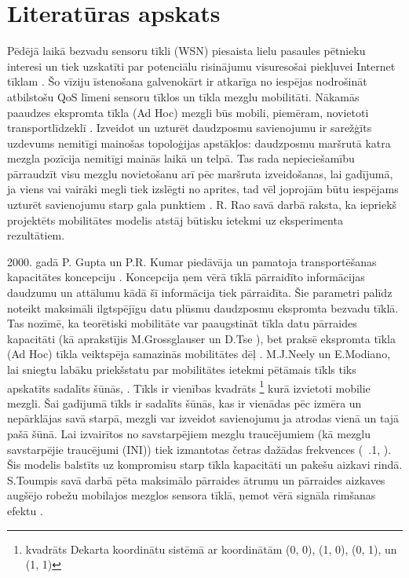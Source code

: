 \section{Literatūras apskats}\label{sec:lit}
Pēdējā laikā bezvadu sensoru tīkli (\acs{WSN}) piesaista lielu pasaules pētnieku interesi un tiek uzskatīti par potenciālu risinājumu visuresošai piekļuvei Internet tīklam \cite{perkinsBook,toh}. Šo vīziju īstenošana galvenokārt ir atkarīga no iespējas nodrošināt atbilstošu \acs{QoS} līmeni sensoru tīklos un tīkla mezglu mobilitāti. Nākamās paaudzes ekspromta tīkla (\acs{Ad Hoc}) mezgli būs mobili, piemēram, novietoti transportlīdzeklī \cite{dsdv_mobPc}. Izveidot un uzturēt daudzposmu savienojumu ir sarežģīts uzdevums nemitīgi mainošas topoloģijas apstākļos: daudzposmu maršrutā katra mezgla pozīcija nemitīgi mainās laikā un telpā. Tas rada nepieciešamību pārraudzīt visu mezglu novietošanu arī pēc maršruta izveidošanas, lai gadījumā, ja viens vai vairāki megli tiek izslēgti no aprites, tad vēl joprojām būtu iespējams uzturēt savienojumu starp gala punktiem \cite{park, lim, son}. R. Rao savā darbā \cite{rao} raksta, ka iepriekš projektēts mobilitātes modelis atstāj būtisku ietekmi uz eksperimenta rezultātiem.

2000. gadā P. Gupta un P.R. Kumar piedāvāja un pamatoja transportēšanas kapacitātes koncepciju \cite{gupta}. Koncepcija ņem vērā tīklā pārraidīto informācijas daudzumu un attālumu kādā šī informācija tiek pārraidīta. Šie parametri palīdz noteikt maksimāli ilgtspējīgu datu plūsmu daudzposmu ekspromta bezvadu tīklā. Tas nozīmē, ka teorētiski mobilitāte var paaugstināt tīkla datu pārraides kapacitāti (kā aprakstījis M.Grossglauser un D.Tse \cite{grossglauser}), bet praksē ekspromta tīkla (\acs{Ad Hoc}) tīkla veiktspēja samazinās mobilitātes dēļ \cite{perkins_hughes}. M.J.Neely un E.Modiano, lai sniegtu labāku priekšstatu par mobilitātes ietekmi pētāmais tīkls tiks apskatīts sadalīts šūnās, \seename \cite{neely1}. Tīkls ir vienības kvadrāts \footnote{kvadrāts Dekarta koordinātu sistēmā ar koordinātām (0, 0), (1, 0), (0, 1), un (1, 1)} kurā izvietoti mobilie mezgli. Šai gadījumā tīkls ir sadalīts šūnās, kas ir vienādas pēc izmēra un nepārklājas savā starpā, mezgli var izveidot savienojumu ja atrodas vienā un tajā pašā šūnā. Lai izvairītos no savstarpējiem mezglu traucējumiem (kā mezglu savstarpējie traucējumi  (\acs{INI})) tiek izmantotas četras dažādas frekvences (\seename ~\figurename .1, \cite{neely1}). Šis modelis balstīts uz kompromisu starp tīkla kapacitāti un pakešu aizkavi rindā. S.Toumpis savā darbā pēta maksimālo pārraides ātrumu un pārraides aizkaves augšējo robežu mobilajos mezglos sensora tīklā, ņemot vērā signāla rimšanas efektu \cite{toumpis}.

